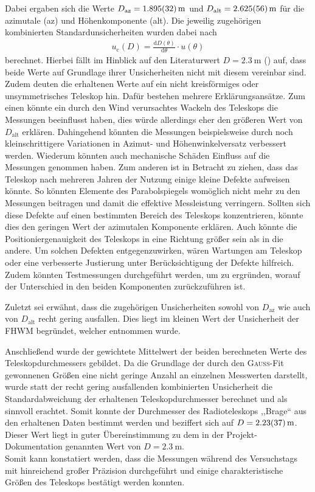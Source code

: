     Dabei ergaben sich die Werte $D_{\text{az}} = \SI{1.895 \pm 0.032}{\metre}$ und $D_{\text{alt}} = \SI{2.625 \pm 0.056}{\metre}$ für die azimutale (az) und Höhenkomponente (alt).
    Die jeweilig zugehörigen kombinierten Standardunsicherheiten wurden dabei nach 
    \begin{align}
        u_{\text{c}}(D) = \frac{\mathrm{d} D(\theta)}{\mathrm{d} \theta} \cdot u(\theta)
    \end{align}
    berechnet.
    Hierbei fällt im Hinblick auf den Literaturwert $D = \SI{2.3}{\metre}$ (\cite{Usermanual}) auf, dass beide Werte auf Grundlage ihrer Unsicherheiten nicht mit diesem vereinbar sind. 
    Zudem deuten die erhaltenen Werte auf ein nicht kreisförmiges oder unsymmetrisches Teleskop hin. 
    Dafür bestehen mehrere Erklärungsansätze. 
    Zum einen könnte ein durch den Wind verursachtes Wackeln des Teleskops die Messungen beeinflusst haben, dies würde allerdings eher den größeren Wert von $D_{\text{alt}}$ erklären. 
    Dahingehend könnten die Messungen beispielsweise durch noch kleinschrittigere Variationen in Azimut- und Höhenwinkelversatz verbessert werden.
    Wiederum könnten auch mechanische Schäden Einfluss auf die Messungen genommen haben. 
    Zum anderen ist in Betracht zu ziehen, dass das Teleskop nach mehreren Jahren der Nutzung einige kleine Defekte aufweisen könnte. 
    So könnten Elemente des Parabolspiegels womöglich nicht mehr zu den Messungen beitragen und damit die effektive Messleistung verringern. 
    Sollten sich diese Defekte auf einen bestimmten Bereich des Teleskops konzentrieren, könnte dies den geringen Wert der azimutalen Komponente erklären.
    Auch könnte die Positioniergenauigkeit des Teleskops in eine Richtung größer sein als in die andere.
    Um solchen Defekten entgegenzuwirken, wären Wartungen am Teleskop oder eine verbesserte Justierung unter Berücksichtigung der Defekte hilfreich.
    Zudem könnten Testmessungen durchgeführt werden, um zu ergründen, worauf der Unterschied in den beiden Komponenten zurückzuführen ist.

    Zuletzt sei erwähnt, dass die zugehörigen Unsicherheiten sowohl von $D_{\text{az}}$ wie auch von $D_{\text{alt}}$ recht gering ausfallen. Dies liegt im kleinen Wert der Unsicherheit der FHWM begründet, welcher  entnommen wurde.

    Anschließend wurde der gewichtete Mittelwert der beiden berechneten Werte des Teleskopdurchmessers gebildet.
    Da die Grundlage der durch den \textsc{Gauß}-Fit gewonnenen Größen eine nicht geringe Anzahl an einzelnen Messwerten darstellt, wurde statt der recht gering ausfallenden kombinierten Unsicherheit die Standardabweichung der erhaltenen Teleskopdurchmesser berechnet und als sinnvoll erachtet.
    Somit konnte der Durchmesser des Radioteleskops ,,Brage`` aus den erhaltenen Daten bestimmt werden und beziffert sich auf $D = \SI{2.23 \pm 0.37}{\metre}$. Dieser Wert liegt in guter Übereinstimmung zu dem in der Projekt-Dokumentation \cite{Usermanual} genannten Wert von $D = \SI{2.3}{\metre}$. \\    
    
    Somit kann konstatiert werden, dass die Messungen während des Versuchstags mit hinreichend großer Präzision durchgeführt und einige charakteristische Größen des Teleskops bestätigt werden konnten.